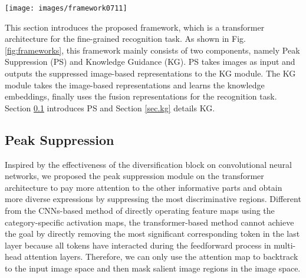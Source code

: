 \documentclass[5p,twocolumn]{elsarticle}
\begin{document}
\begin{figure*}
\centering
 \texttt{[image: images/framework0711]}
  \caption{Overview of our framework. Here we visualize the case of peak suppression and knowledge guidance given a training batch with a image and its corresponding label Yellow-breasted Chat. $S(\cdot)$ means the similarity function. Only the presentation label is used to predict in testing.}
  \label{fig:frameworks}
\end{figure*}

This section introduces the proposed framework, which is a transformer architecture for the fine-grained recognition task. 
As shown in Fig. \ref{fig:frameworks}, this framework mainly consists of two components,  namely  Peak Suppression (PS) and Knowledge Guidance (KG).
PS takes images as input and outputs the suppressed image-based representations to the KG module.  The KG module takes the image-based representations and learns the knowledge embeddings, finally uses the fusion representations for the recognition task. 
Section \ref{sec.ps} introduces PS and Section \ref{sec.kg} details KG.

\subsection{Peak Suppression} \label{sec.ps}
Inspired by the effectiveness of the diversification block on convolutional neural networks, we proposed the peak suppression module on the transformer architecture to pay more attention to the other informative parts and obtain more diverse expressions by suppressing the most discriminative regions. Different from the CNNs-based method of directly operating feature maps using the category-specific activation maps, the transformer-based method cannot achieve the goal by directly removing the most significant corresponding token in the last layer because all tokens have interacted during the feedforward process in multi-head attention layers. Therefore, we can only use the attention map to backtrack to the input image space and then mask salient image regions in the image space. 
\end{document}
